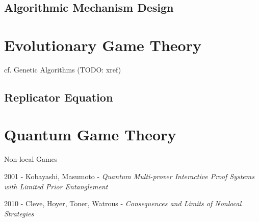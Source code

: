 \subsection{Algorithmic Mechanism Design}
\label{sec:algorithmic_mechanism_design}



\section{Evolutionary Game Theory}\label{sec:evolutionary_game_theory}

cf. Genetic Algorithms (TODO: xref)



\subsection{Replicator Equation}\label{sec:replicator_equation}



\section{Quantum Game Theory}\label{sec:quantum_game_theory}

Non-local Games

2001 - Kobayashi, Masumoto - \emph{Quantum Multi-prover Interactive Proof
  Systems with Limited Prior Entanglement}

2010 - Cleve, Hoyer, Toner, Watrous -
\emph{Consequences and Limits of Nonlocal Strategies}

